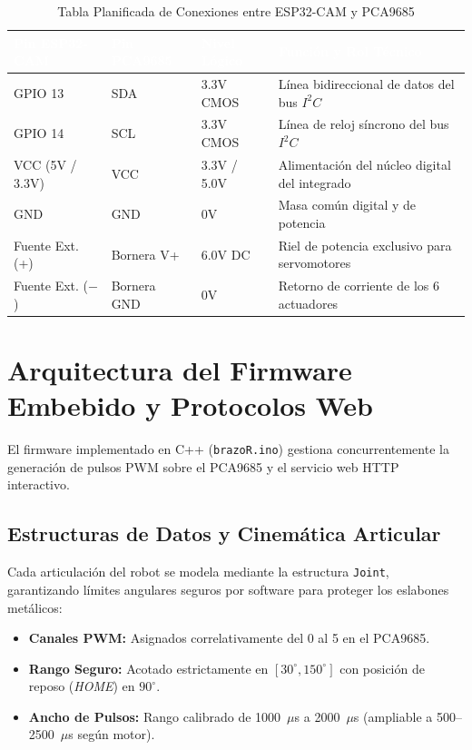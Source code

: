 \documentclass[11pt,a4paper]{article}
\begin{document}
\begin{table}[H]
\centering
\caption{Tabla Planificada de Conexiones entre ESP32-CAM y PCA9685}
\label{tab:pinout_completo}
\small
\begin{tabularx}{\textwidth}{l l l X}
\toprule
\rowcolor{tableheader}
\textcolor{white}{\textbf{Pin ESP32-CAM}} & \textcolor{white}{\textbf{Pin PCA9685}} & \textcolor{white}{\textbf{Nivel Lógico}} & \textcolor{white}{\textbf{Función y Rol Técnico}} \\
\midrule
GPIO 13 & SDA & 3.3V CMOS & Línea bidireccional de datos del bus $I^2C$ \\
\rowcolor{tablezebra}
GPIO 14 & SCL & 3.3V CMOS & Línea de reloj síncrono del bus $I^2C$ \\
VCC (5V / 3.3V) & VCC & 3.3V / 5.0V & Alimentación del núcleo digital del integrado \\
\rowcolor{tablezebra}
GND & GND & 0V & Masa común digital y de potencia \\
Fuente Ext. (+) & Bornera V+ & 6.0V DC & Riel de potencia exclusivo para servomotores \\
\rowcolor{tablezebra}
Fuente Ext. ($-$) & Bornera GND & 0V & Retorno de corriente de los 6 actuadores \\
\bottomrule
\end{tabularx}
\end{table}

\section{Arquitectura del Firmware Embebido y Protocolos Web}

El firmware implementado en C++ (\texttt{brazoR.ino}) gestiona concurrentemente la generación de pulsos PWM sobre el PCA9685 y el servicio web HTTP interactivo.

\subsection{Estructuras de Datos y Cinemática Articular}
Cada articulación del robot se modela mediante la estructura \texttt{Joint}, garantizando límites angulares seguros por software para proteger los eslabones metálicos:
\begin{itemize}
    \item \textbf{Canales PWM:} Asignados correlativamente del 0 al 5 en el PCA9685.
    \item \textbf{Rango Seguro:} Acotado estrictamente en $[30^\circ, 150^\circ]$ con posición de reposo (\textit{HOME}) en $90^\circ$.
    \item \textbf{Ancho de Pulsos:} Rango calibrado de 1000~$\mu$s a 2000~$\mu$s (ampliable a 500--2500~$\mu$s según motor).
\end{itemize}
\end{document}
